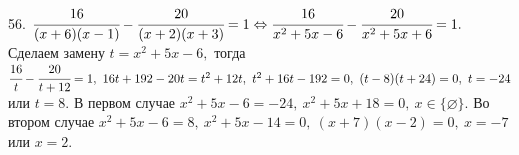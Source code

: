56. $\cfrac{16}{(x+6)(x-1)}-\cfrac{20}{(x+2)(x+3)}=1\Leftrightarrow\cfrac{16}{x^2+5x-6}-\cfrac{20}{x^2+5x+6}=1.$ Сделаем замену $t=x^2+5x-6,$ тогда $\cfrac{16}{t}-\cfrac{20}{t+12}=1,\ 16t+192-20t=t^2+12t,\ t^2+16t-192=0,\ (t-8)(t+24)=0,\ t=-24$ или $t=8.$ В первом случае $x^2+5x-6=-24,\ x^2+5x+18=0,\ x\in\{\varnothing\}.$ Во втором случае $x^2+5x-6=8,\ x^2+5x-14=0,\ (x+7)(x-2)=0,\ x=-7$ или $x=2.$\\
